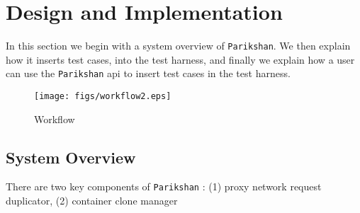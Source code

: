 
\section{Design and Implementation}

In this section we begin with a system overview of \texttt{Parikshan}. 
We then explain how it inserts test cases, into the test harness, and finally we explain how a user can use the \texttt{Parikshan} api to insert test cases in the test harness.

\begin{figure*}[t]
  \begin{center}
    \texttt{[image: figs/workflow2.eps]}
    \caption{Workflow}
    \label{fig:Backend wrapped around with Parakishan Run-time}
  \end{center}
\end{figure*}


\subsection{System Overview}

There are two key components of \texttt{Parikshan} : (1) proxy network request duplicator, (2) container clone manager


